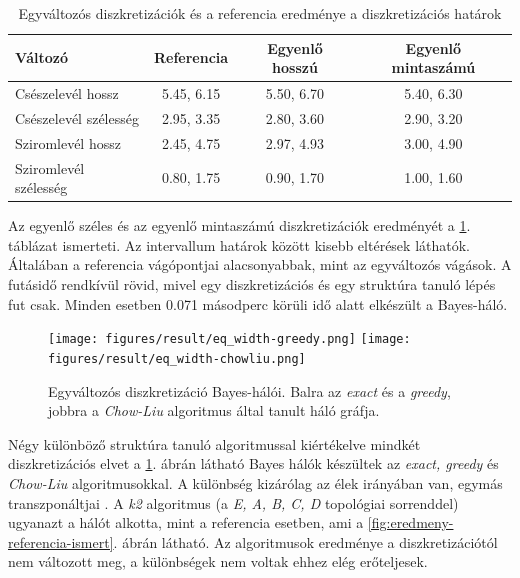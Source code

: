\begin{table}[htp]\centering
    \begin{tabular}{lccc}
        Változó               & Referencia & Egyenlő hosszú & Egyenlő mintaszámú \\ \hline
        Csészelevél hossz     & 5.45, 6.15 & 5.50, 6.70     & 5.40, 6.30                              \\
        Csészelevél szélesség & 2.95, 3.35 & 2.80, 3.60     & 2.90, 3.20                              \\
        Sziromlevél hossz     & 2.45, 4.75 & 2.97, 4.93     & 3.00, 4.90                              \\
        Sziromlevél szélesség & 0.80, 1.75 & 0.90, 1.70     & 1.00, 1.60                              \\
    \end{tabular}
\caption{Egyváltozós diszkretizációk és a referencia eredménye a diszkretizációs határok}
\label{tab:eredmeny-egyvaltozos}
\end{table}


Az egyenlő széles és az egyenlő mintaszámú diszkretizációk eredményét a \ref{tab:eredmeny-egyvaltozos}. táblázat ismerteti. Az intervallum határok között kisebb eltérések láthatók. Általában a referencia vágópontjai alacsonyabbak, mint az egyváltozós vágások. A futásidő rendkívül rövid, mivel egy diszkretizációs és egy struktúra tanuló lépés fut csak. Minden esetben 0.071 másodperc körüli idő alatt elkészült a Bayes-háló.

\begin{figure}[htp]
    \centering
    \texttt{[image: figures/result/eq\_width-greedy.png]} \hfill
    \texttt{[image: figures/result/eq\_width-chowliu.png]}
    \caption{Egyváltozós diszkretizáció Bayes-hálói. Balra az \emph{exact} és a \emph{greedy}, jobbra a \emph{Chow-Liu} algoritmus által tanult háló gráfja.}
    \label{fig:eredmeny-egyvaltozos}
\end{figure}

Négy különböző struktúra tanuló algoritmussal kiértékelve mindkét diszkretizációs elvet a \ref{fig:eredmeny-egyvaltozos}. ábrán látható Bayes hálók készültek az \emph{exact, greedy} és \emph{Chow-Liu} algoritmusokkal. A különbség kizárólag az élek irányában van, egymás transzponáltjai \cite{essam1970some}. A \emph{k2} algoritmus (a \emph{E, A, B, C, D} topológiai sorrenddel) ugyanazt a hálót alkotta, mint a referencia esetben, ami a \ref{fig:eredmeny-referencia-ismert}. ábrán látható. Az algoritmusok eredménye a diszkretizációtól nem változott meg, a különbségek nem voltak ehhez elég erőteljesek.

